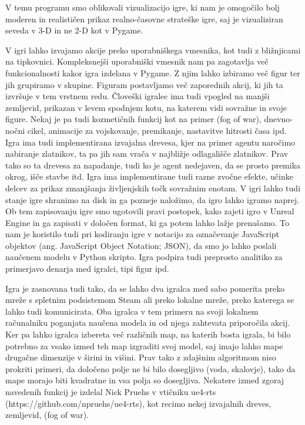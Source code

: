 \documentclass[a4paper, 12pt]{book}
\begin{document}
V temu programu smo oblikovali vizualizacijo igre, ki nam je omogočilo bolj moderen in realističen prikaz realno-časovne strateške igre, saj je vizualiziran seveda v 3-D in ne 2-D kot v Pygame.

V igri lahko izvajamo akcije preko uporabniškega vmesnika, kot tudi z bližnjicami na tipkovnici.
Kompleksnejši uporabniški vmesnik nam pa zagotavlja več funkcionalnosti kakor igra izdelana v Pygame.
Z njim lahko izbiramo več figur ter jih grupiramo v skupine.
Figuram postavljamo več zaporednih akcij, ki jih ta izvršuje v tem vrstnem redu.
Človeški igralec ima tudi vpogled na manjši zemljevid, prikazan v levem spodnjem kotu, na katerem vidi sovražne in svoje figure.
Nekaj je pa tudi kozmetičnih funkcij kot na primer (fog of war), dnevno-nočni cikel, animacije za vojskovanje, premikanje, nastavitve hitrosti časa ipd.
Igra ima tudi implementirana izvajalna drevesa, kjer na primer agentu naročimo nabiranje zlatnikov, ta pa jih sam vrača v najbližje odlagališče zlatnikov.
Prav tako so ta drevesa za napadanje, tudi ko je agent nedejaven, da se prosto premika okrog, išče stavbe itd.
Igra ima implementirane tudi razne zvočne efekte, učinke delcev za prikaz zmanjšanja življenjskih točk sovražnim enotam.
V igri lahko tudi stanje igre shranimo na disk in ga pozneje naložimo, da igro lahko igramo naprej.
Ob tem zapisovanju igre smo ugotovili pravi postopek, kako zajeti igro v Unreal Engine in ga zapisati v določen format, ki ga potem lahko lažje prenašamo.
To nam je koristilo tudi pri kodiranju igre v notacijo za označevanje JavaScript objektov (ang. JavaScript Object Notation; JSON), da smo jo lahko poslali naučenem modelu v Python skripto.
Igra podpira tudi preprosto analitiko za primerjavo denarja med igralci, tipi figur ipd.

Igra je zasnovana tudi tako, da se lahko dva igralca med sabo pomerita preko mreže s spletnim podsistemom Steam ali preko lokalne mreže, preko katerega se lahko tudi komunicirata.
Oba igralca v tem primeru na svoji lokalnem računalniku poganjata naučena modela in od njega zahtevata priporočila akcij.
Ker pa lahko igralca izbereta več različnih map, na katerih bosta igrala, bi bilo potrebno za vsako izmed teh map izgraditi svoj model, saj imajo lahko mape drugačne dimenzije v širini in višini.
Prav tako z zdajšnim algoritmom niso prokriti primeri, da določeno polje ne bi bilo dosegljivo (voda, skalovje), tako da mape morajo biti kvadratne in vsa polja so dosegljiva.
Nekatere izmed zgoraj navedenih funkcij je izdelal Nick Pruehs v vtičniku ue4-rts (https://github.com/npruehs/ue4-rts), kot recimo nekej izvajalnih dreves, zemljevid, (fog of war).
\end{document}
